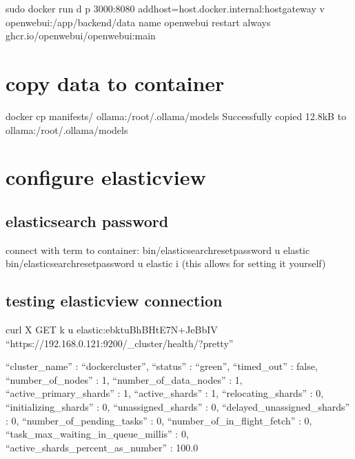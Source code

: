 \documentclass[letterpaper,10pt,english]{sphinxmanual}
\begin{document}
\sphinxAtStartPar
sudo docker run \sphinxhyphen{}d \sphinxhyphen{}p 3000:8080 \textendash{}add\sphinxhyphen{}host=host.docker.internal:host\sphinxhyphen{}gateway \sphinxhyphen{}v open\sphinxhyphen{}webui:/app/backend/data \textendash{}name open\sphinxhyphen{}webui \textendash{}restart always ghcr.io/open\sphinxhyphen{}webui/open\sphinxhyphen{}webui:main


\chapter{copy data to container}
\label{\detokenize{docker:copy-data-to-container}}
\sphinxAtStartPar
docker cp manifests/ ollama:/root/.ollama/models
Successfully copied 12.8kB to ollama:/root/.ollama/models

\sphinxstepscope


\chapter{configure elasticview}
\label{\detokenize{elastic:configure-elasticview}}\label{\detokenize{elastic::doc}}

\section{elasticsearch password}
\label{\detokenize{elastic:elasticsearch-password}}
\sphinxAtStartPar
connect with term to container:
bin/elasticsearch\sphinxhyphen{}reset\sphinxhyphen{}password \sphinxhyphen{}u elastic
bin/elasticsearch\sphinxhyphen{}reset\sphinxhyphen{}password \sphinxhyphen{}u elastic \sphinxhyphen{}i (this allows for setting it yourself)


\section{testing elasticview connection}
\label{\detokenize{elastic:testing-elasticview-connection}}
\sphinxAtStartPar
curl \sphinxhyphen{}X GET \sphinxhyphen{}k \sphinxhyphen{}u elastic:ebktuBhBHtE7N+JeBbIV “https://192.168.0.121:9200/\_cluster/health/?pretty”
\begin{description}
\sphinxlineitem{\{}
\sphinxAtStartPar
“cluster\_name” : “docker\sphinxhyphen{}cluster”,
“status” : “green”,
“timed\_out” : false,
“number\_of\_nodes” : 1,
“number\_of\_data\_nodes” : 1,
“active\_primary\_shards” : 1,
“active\_shards” : 1,
“relocating\_shards” : 0,
“initializing\_shards” : 0,
“unassigned\_shards” : 0,
“delayed\_unassigned\_shards” : 0,
“number\_of\_pending\_tasks” : 0,
“number\_of\_in\_flight\_fetch” : 0,
“task\_max\_waiting\_in\_queue\_millis” : 0,
“active\_shards\_percent\_as\_number” : 100.0

\end{description}
\end{document}
